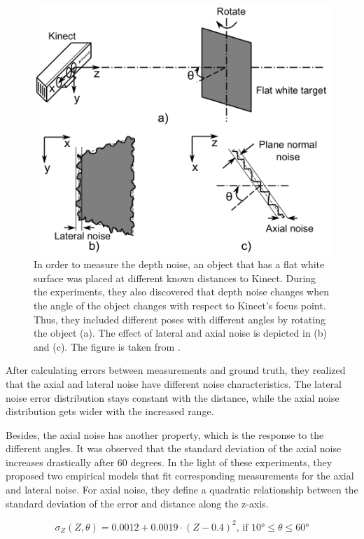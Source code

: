 \documentclass[12pt]{report}
\numberwithin{figure}{section}
\begin{document}
\begin{figure}[H] \centering
\includegraphics[width=0.7\linewidth,natwidth=640,natheight=640]
{fig/ref_imgs/kinect_noise_experiment.png} \caption[Kinect's Depth Noise
Experiment]{In order to measure the depth noise, an object that has a flat 
white
surface was placed at different known distances to Kinect. During the
experiments, they also discovered that depth noise changes when the angle of
the object changes with respect to Kinect's focus point. Thus, they included
different poses with different angles by rotating the object (a).  The effect
of lateral and axial noise is depicted in (b) and (c).  The figure is taken
from \parencite{Nguyen2012a}.} \label{fig:kinect_noise_experiment} \end{figure}

After calculating errors between measurements and ground truth, they realized
that the axial and lateral noise have different noise characteristics. The
lateral noise error distribution stays constant with the distance, while the
axial noise distribution gets wider with the increased range.

Besides, the axial noise has another property, which is the response to the
different angles. It was observed that the standard deviation of the axial
noise increases drastically after 60 degrees.  In the light of these
experiments, they proposed two empirical models that fit corresponding
measurements for the axial and lateral noise.  For axial noise, they define a
quadratic relationship between the standard deviation of the error and distance
along the z-axis. 

\begin{equation}\label{eq:depth_noise_model} \sigma_Z (Z,\theta) = 0.0012 +
0.0019 \cdot (Z-0.4)^2 \text{, if } \ang{10}\leq \theta \leq \ang{60}
\end{equation}
\end{document}
